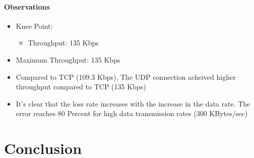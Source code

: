 \documentclass[aps,letterpaper,10pt]{revtex4}
\begin{document}
            \vspace{3mm}
            
            \paragraph{Observations}
                \begin{itemize}
                        \item Knee Point:
                            \begin{itemize}
                                \item Throughput: 135 Kbps
                            \end{itemize}
                        \item Maximum Throughput: 135 Kbps
                        \item Compared to TCP (109.3 Kbps), The UDP connection acheived higher throughput compared to TCP (135 Kbps)
                        \item It's clear that the loss rate increases with the increase in the data rate. The error reaches 80 Percent for high data transmission rates (300 KBytes/sec)
                \end{itemize}
                
\newpage                
    \section{Conclusion}
\end{document}
